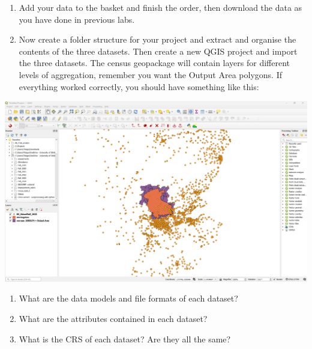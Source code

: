 \documentclass[
  letterpaper,
  DIV=11,
  numbers=noendperiod]{scrreprt}
\providecommand{\tightlist}{%
  \setlength{\itemsep}{0pt}\setlength{\parskip}{0pt}}\usepackage{longtable,booktabs,array}
\begin{document}
\begin{enumerate}
\def\labelenumi{(\arabic{enumi})}
\setcounter{enumi}{280}
\tightlist
\item
  Add your data to the basket and finish the order, then download the
  data as you have done in previous labs.
\item
  Now create a folder structure for your project and extract and
  organise the contents of the three datasets. Then create a new QGIS
  project and import the three datasets. The census geopackage will
  contain layers for different levels of aggregation, remember you want
  the Output Area polygons. If everything worked correctly, you should
  have something like this:
\end{enumerate}

\includegraphics{images/lab_geoprocessing/Fig2_qgis_import.png}

\begin{tcolorbox}[enhanced jigsaw, coltitle=black, toprule=.15mm, breakable, opacitybacktitle=0.6, left=2mm, colback=white, leftrule=.75mm, rightrule=.15mm, colbacktitle=quarto-callout-important-color!10!white, toptitle=1mm, titlerule=0mm, colframe=quarto-callout-important-color-frame, arc=.35mm, bottomtitle=1mm, opacityback=0, bottomrule=.15mm, title=\textcolor{quarto-callout-important-color}{\faExclamation}\hspace{0.5em}{Stop and Think}]

\begin{enumerate}
\def\labelenumi{\arabic{enumi}.}
\item
  What are the data models and file formats of each dataset?
\item
  What are the attributes contained in each dataset?
\item
  What is the CRS of each dataset? Are they all the same?
\end{enumerate}

\end{tcolorbox}
\end{document}
